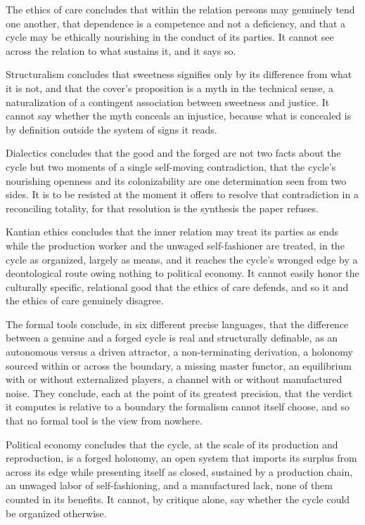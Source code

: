 \documentclass[11pt,a4paper]{article}
\begin{document}
The ethics of care concludes that within the relation persons may genuinely tend one another, that dependence is a competence and not a deficiency, and that a cycle may be ethically nourishing in the conduct of its parties. It cannot see across the relation to what sustains it, and it says so.

Structuralism concludes that sweetness signifies only by its difference from what it is not, and that the cover's proposition is a myth in the technical sense, a naturalization of a contingent association between sweetness and justice. It cannot say whether the myth conceals an injustice, because what is concealed is by definition outside the system of signs it reads.

Dialectics concludes that the good and the forged are not two facts about the cycle but two moments of a single self-moving contradiction, that the cycle's nourishing openness and its colonizability are one determination seen from two sides. It is to be resisted at the moment it offers to resolve that contradiction in a reconciling totality, for that resolution is the synthesis the paper refuses.

Kantian ethics concludes that the inner relation may treat its parties as ends while the production worker and the unwaged self-fashioner are treated, in the cycle as organized, largely as means, and it reaches the cycle's wronged edge by a deontological route owing nothing to political economy. It cannot easily honor the culturally specific, relational good that the ethics of care defends, and so it and the ethics of care genuinely disagree.

The formal tools conclude, in six different precise languages, that the difference between a genuine and a forged cycle is real and structurally definable, as an autonomous versus a driven attractor, a non-terminating derivation, a holonomy sourced within or across the boundary, a missing master functor, an equilibrium with or without externalized players, a channel with or without manufactured noise. They conclude, each at the point of its greatest precision, that the verdict it computes is relative to a boundary the formalism cannot itself choose, and so that no formal tool is the view from nowhere.

Political economy concludes that the cycle, at the scale of its production and reproduction, is a forged holonomy, an open system that imports its surplus from across its edge while presenting itself as closed, sustained by a production chain, an unwaged labor of self-fashioning, and a manufactured lack, none of them counted in its benefits. It cannot, by critique alone, say whether the cycle could be organized otherwise.
\end{document}
